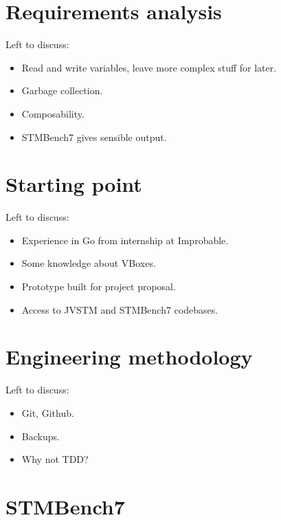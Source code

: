 \documentclass[12pt,a4paper,oneside,openright]{report}
\begin{document}
\section{Requirements analysis}
\label{sec:requ-analys}

Left to discuss:

\begin{itemize}
\item Read and write variables, leave more complex stuff for later.
\item Garbage collection.
\item Composability.
\item STMBench7 gives sensible output.
\end{itemize}

\section{Starting point}
\label{sec:starting-point}

Left to discuss:

\begin{itemize}
\item Experience in Go from internship at Improbable.
\item Some knowledge about VBoxes.
\item Prototype built for project proposal.
\item Access to JVSTM and STMBench7 codebases.
\end{itemize}

\section{Engineering methodology}
\label{sec:engin-meth}

Left to discuss:

\begin{itemize}
\item Git, Github.
\item Backups.
\item Why not TDD?
\end{itemize}

\section{STMBench7}
\label{sec:prep:stmbench7}


\end{document}
